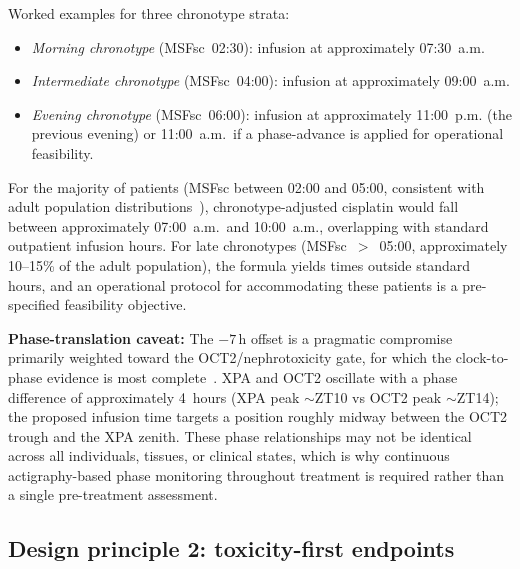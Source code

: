 \documentclass[preprint,review,12pt]{elsarticle}
\begin{document}
Worked examples for three chronotype strata:
\begin{itemize}
  \item \emph{Morning chronotype} (MSFsc~02:30): infusion at
    approximately 07:30~a.m.
  \item \emph{Intermediate chronotype} (MSFsc~04:00): infusion at
    approximately 09:00~a.m.
  \item \emph{Evening chronotype} (MSFsc~06:00): infusion at
    approximately 11:00~p.m. (the previous evening) or 11:00~a.m.\ if a
    phase-advance is applied for operational feasibility.
\end{itemize}
For the majority of patients (MSFsc between 02:00 and 05:00, consistent
with adult population distributions~\cite{Roenneberg2003}), chronotype-adjusted
cisplatin would fall between approximately 07:00~a.m.\ and 10:00~a.m.,
overlapping with standard outpatient infusion hours.  For late chronotypes
(MSFsc~$>$~05:00, approximately 10--15\% of the adult population), the
formula yields times outside standard hours, and an operational protocol for
accommodating these patients is a pre-specified feasibility objective.

\textbf{Phase-translation caveat:} The $-7$\,h offset is a pragmatic
compromise primarily weighted toward the OCT2/nephrotoxicity gate, for
which the clock-to-phase evidence is most complete~\cite{Oda2014}.  XPA
and OCT2 oscillate with a phase difference of approximately 4~hours
(XPA peak $\sim$ZT10 vs OCT2 peak $\sim$ZT14); the proposed infusion
time targets a position roughly midway between the OCT2 trough and the
XPA zenith.  These phase relationships may not be identical across all
individuals, tissues, or clinical states, which is why continuous
actigraphy-based phase monitoring throughout treatment is required
rather than a single pre-treatment assessment.

\subsection{Design principle 2: toxicity-first endpoints}
\end{document}
